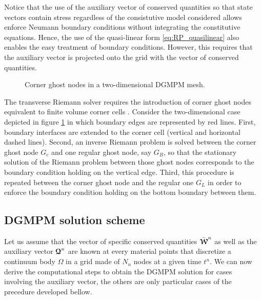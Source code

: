 Notice that the use of the auxiliary vector of conserved quantities so that state vectors contain stress regardless of the consistutive model considered allows enforce Neumann boundary conditions without integrating the constitutive equations. Hence, the use of the quasi-linear form \eqref{eq:RP_quasilinear} also enables the easy treatment of boundary conditions. However, this requires that the auxiliary vector is projected onto the grid with the vector of conserved quantities.

\begin{figure}[ht]
  \centering
  
  \caption{Corner ghost nodes in a two-dimensional DGMPM mesh.}
  \label{fig:corner_ghost}
\end{figure}

The transverse Riemann solver requires the introduction of corner ghost nodes equivalent to finite volume corner cells \cite{Leveque}. Consider the two-dimensional case depicted in figure \ref{fig:corner_ghost} in which boundary edges are represented by red lines. First, boundary interfaces are extended to the corner cell (vertical and horizontal dashed lines). Second, an inverse Riemann problem is solved between the corner ghost node $G_c$ and one regular ghost node, say $G_B$, so that the stationary solution of the Riemann problem between those ghost nodes corresponds to the boundary condition holding on the vertical edge. Third, this procedure is repeated between the corner ghost node and the regular one $G_L$ in order to enforce the boundary condition holding on the bottom boundary between them. 



\subsection{DGMPM solution scheme}
Let us assume that the vector of specific conserved quantities $\bar{{\boldsymbol{\mathcal{W}}}}^n$ as well as the auxiliary vector ${\boldsymbol{\mathcal{Q}}}^n$ are known at every material points that discretize a continuum body $\Omega$ in a grid made of $N_{n}$ nodes at a given time $t^n$. We can now derive the computational steps to obtain the DGMPM solution for cases involving the auxiliary vector, the others are only particular cases of the precedure developed bellow.%

